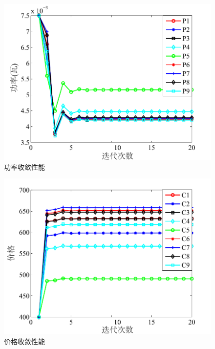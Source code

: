 \begin{figure}[H]
\centering
\includegraphics[width=12cm]{figures//chap2//2.pdf}
\caption{功率收敛性能}
\label{F2}
\end{figure}
\begin{figure}[H]
\centering
\includegraphics[width=12cm]{figures//chap2//3.pdf}
\caption{价格收敛性能}
\label{F3}
\end{figure}

